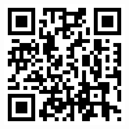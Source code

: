 \documentclass[portrait,final,a0paper,fontscale=0.277]{baposter}
\begin{document}
\begin{poster}
{\begin{thebibliography}{1}
\begin{minipage}{\linewidth}
\begin{minipage}{0.12\linewidth}
\begin{center}
			\hfill\includegraphics[width=\linewidth]{junin_qrcode}
		\end{center}
		\end{minipage}
		\end{minipage}
      \end{thebibliography}
  }

\end{poster}
\end{document}
